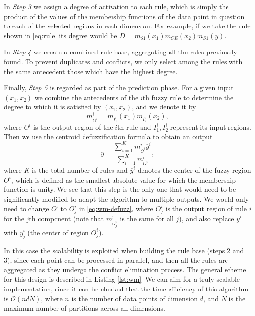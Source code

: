 In \textit{Step 3} we assign a degree of activation to each rule, which is simply the product of the values of the membership functions of the data point in question to each of the selected regions in each dimension. For example, if we take the rule shown in \eqref{eq:rule} its degree would be $D=m_{S1}(x_1)m_{CE}(x_2)m_{S1}(y)$.

In \textit{Step 4} we create a combined rule base, aggregating all the rules previously found. To prevent duplicates and conflicts, we only select among the rules with the same antecedent those which have the highest degree.

Finally, \textit{Step 5} is regarded as part of the prediction phase. For a given input $(x_1,x_2)$ we combine the antecedents of the $i$th fuzzy rule to determine the degree to which it is satisfied by $(x_1,x_2)$, and we denote it by
\[
m^i_{O^i} = m_{I_1^i}(x_1)m_{I_2^i}(x_2),
\]
where $O^i$ is the output region of the $i$th rule and $I_1^i, I_2^i$ represent its input regions. Then we use the centroid defuzzification formula to obtain an output
\begin{equation}\label{eq:wm-defuzz}
  y = \dfrac{\displaystyle \sum_{i=1}^K m^i_{O^i}\overbar{y}^i}{\displaystyle \sum_{i=1}^K m^i_{O^i}},
\end{equation}
where $K$ is the total number of rules and $\overbar{y}^i$ denotes the center of the fuzzy region $O^i$, which is defined as the smallest absolute value for which the membership function is unity. We see that this step is the only one that would need to be significantly modified to adapt the algorithm to multiple outputs. We would only need to change $O^i$ to $O^{i}_j$ in \eqref{eq:wm-defuzz}, where $O^{i}_j$ is the output region of rule $i$ for the $j$th component (note that $m^i_{O^i_j}$ is the same for all $j$), and also replace $\overbar{y}^i$ with $\overbar{y}^i_j$ (the center of region $O_j^{i}$).

In this case the scalability is exploited when building the rule base (steps 2 and 3), since each point can be processed in parallel, and then all the rules are aggregated as they undergo the conflict elimination process. The general scheme for this design is described in Listing \ref{lst:wm}. We can aim for a truly scalable implementation, since it can be checked that the time efficiency of this algorithm is $\mathcal O (ndN)$, where $n$ is the number of data points of dimension $d$, and $N$ is the maximum number of partitions across all dimensions.

